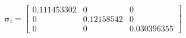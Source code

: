 $$
\boldsymbol\sigma_i = \left[\begin{matrix}0.111453302 & 0 & 0\\0 & 0.12158542 & 0\\0 & 0 & 0.030396355\end{matrix}\right]
$$
